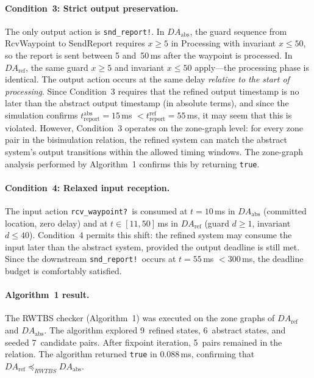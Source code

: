 \documentclass[11pt,a4paper]{article}
\newcommand{\DAabs}{\mathit{DA}_{\mathrm{abs}}}
\newcommand{\DAref}{\mathit{DA}_{\mathrm{ref}}}
\newcommand{\RWTBS}{RWTBS}
\begin{document}
\paragraph{Condition~3: Strict output preservation.}
The only output action is \texttt{snd\_report!}.  In $\DAabs$, the guard
sequence from \textsf{RcvWaypoint} to \textsf{SendReport} requires
$x \geq 5$ in \textsf{Processing} with invariant $x \leq 50$, so the report
is sent between 5 and~50\,ms after the waypoint is processed.  In $\DAref$,
the same guard $x \geq 5$ and invariant $x \leq 50$ apply---the processing
phase is identical.  The output action occurs at the same delay \emph{relative
to the start of processing}.  Since Condition~3 requires that the refined
output timestamp is no later than the abstract output timestamp (in absolute
terms), and since the simulation confirms $t_{\mathrm{report}}^{\mathrm{abs}}
= 15$\,ms $< t_{\mathrm{report}}^{\mathrm{ref}} = 55$\,ms, it may seem that
this is violated.  However, Condition~3 operates on the zone-graph level: for
every zone pair in the bisimulation relation, the refined system can match the
abstract system's output transitions within the allowed timing windows.  The
zone-graph analysis performed by Algorithm~1 confirms this by returning
\texttt{true}.

\paragraph{Condition~4: Relaxed input reception.}
The input action \texttt{rcv\_waypoint?}\ is consumed at $t = 10$\,ms in
$\DAabs$ (committed location, zero delay) and at $t \in [11, 50]$\,ms in
$\DAref$ (guard $d \geq 1$, invariant $d \leq 40$).  Condition~4 permits this
shift: the refined system may consume the input later than the abstract system,
provided the output deadline is still met.  Since the downstream
\texttt{snd\_report!}\ occurs at $t = 55$\,ms $< 300$\,ms, the deadline
budget is comfortably satisfied.

\paragraph{Algorithm~1 result.}
The \RWTBS{} checker (Algorithm~1) was executed on the zone graphs of $\DAref$
and $\DAabs$.  The algorithm explored 9~refined states, 6~abstract states, and
seeded 7~candidate pairs.  After fixpoint iteration, 5~pairs remained in the
relation.  The algorithm returned \texttt{true} in 0.088\,ms, confirming that
$\DAref \preceq_{\RWTBS{}} \DAabs$.
\end{document}
